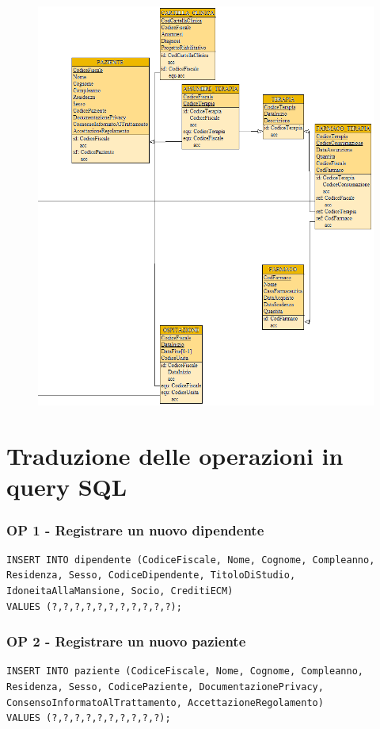 \documentclass[a4paper, 12pt]{report}
\begin{document}
\begin{figure}[H]
        \centering
        \includegraphics[width=1.0\textwidth]{img/schemaRelazionaleDX.png}
\end{figure}
\newpage

\section{Traduzione delle operazioni in query SQL}

\subsubsection*{OP 1 - Registrare un nuovo dipendente}
\begin{lstlisting}[breaklines=true]
INSERT INTO dipendente (CodiceFiscale, Nome, Cognome, Compleanno, Residenza, Sesso, CodiceDipendente, TitoloDiStudio, IdoneitaAllaMansione, Socio, CreditiECM)
VALUES (?,?,?,?,?,?,?,?,?,?,?);
\end{lstlisting}

\subsubsection*{OP 2 - Registrare un nuovo paziente}
\begin{lstlisting}[breaklines=true]
INSERT INTO paziente (CodiceFiscale, Nome, Cognome, Compleanno, Residenza, Sesso, CodicePaziente, DocumentazionePrivacy, ConsensoInformatoAlTrattamento, AccettazioneRegolamento)
VALUES (?,?,?,?,?,?,?,?,?,?);
\end{lstlisting}
\end{document}
